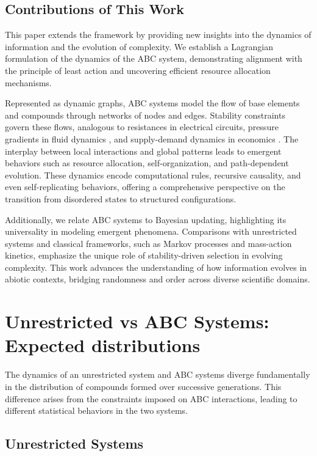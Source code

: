 \documentclass[entropy,article,submit,pdftex,oneauthor]{Definitions/mdpi}
\begin{document}
\subsection{Contributions of This Work}

This paper extends the framework by providing new insights into the dynamics of information and the evolution of complexity. We establish a Lagrangian formulation of the dynamics of the ABC system, demonstrating alignment with the principle of least action and uncovering efficient resource allocation mechanisms. 

Represented as dynamic graphs, ABC systems model the flow of base elements and compounds through networks of nodes and edges. Stability constraints govern these flows, analogous to resistances in electrical circuits, pressure gradients in fluid dynamics \cite{landau1987fluid}, and supply-demand dynamics in economics \cite{mascolell1995microeconomic}. The interplay between local interactions and global patterns leads to emergent behaviors such as resource allocation, self-organization, and path-dependent evolution. These dynamics encode computational rules, recursive causality, and even self-replicating behaviors, offering a comprehensive perspective on the transition from disordered states to structured configurations.

Additionally, we relate ABC systems to Bayesian updating, highlighting its universality in modeling emergent phenomena. Comparisons with unrestricted systems and classical frameworks, such as Markov processes and mass-action kinetics, emphasize the unique role of stability-driven selection in evolving complexity. This work advances the understanding of how information evolves in abiotic contexts, bridging randomness and order across diverse scientific domains.

\section{Unrestricted vs ABC Systems: Expected distributions}

The dynamics of an unrestricted system and ABC systems diverge fundamentally in the distribution of compounds formed over successive generations. This difference arises from the constraints imposed on ABC interactions, leading to different statistical behaviors in the two systems.

\subsection{Unrestricted Systems}
\end{document}
